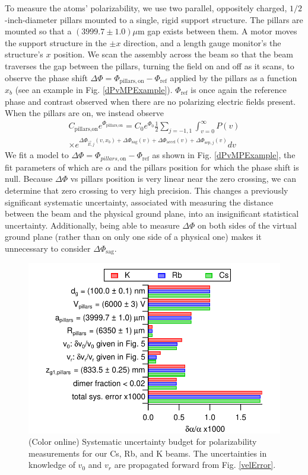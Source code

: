 \documentclass[twocolumn,prl,showpacs,superscriptaddress]{revtex4-1}   %
\newcommand{\figref}[1]{Fig. \ref{#1}}
\newcommand{\dphisepj}{\Delta\Phi_{\mathrm{sep},j}}
\newcommand{\dphisag}{\Delta\Phi_{\mathrm{sag}}}
\newcommand{\dphiaccel}{\Delta\Phi_{\mathrm{accel}}}
\begin{document}
To measure the atoms' polarizability, we use two parallel, oppositely charged, $1/2$-inch-diameter pillars mounted to a single, rigid support structure. The pillars are mounted so that a $(3999.7 \pm 1.0)\mu$m gap exists between them. A motor moves the support structure in the $\pm x$ direction, and a length gauge monitor's the structure's $x$ position. We scan the assembly across the beam so that the beam traverses the gap between the pillars, turning the field on and off as it scans, to observe the phase shift $\Delta\Phi = \Phi_{\mathrm{pillars,on}} - \Phi_{\mathrm{ref}}$ applied by the pillars as a function $x_b$ (see an example in \figref{dPvMPExample}). $\Phi_{\mathrm{ref}}$ is once again the reference phase and contrast observed when there are no polarizing electric fields present.
When the pillars are on, we instead observe
\begin{align}
	C_{\textrm{pillars,on}}e^{\Phi_{\textrm{pillars,on}}} = 
		C_0e^{\Phi_0}		
		\frac{1}{2} \sum_{j=-1,1}
		\int_{v=0}^{\infty} P(v) \nonumber \\ \times
		e^{
			\Delta\Phi_{\vec{E},j}(v,x_b) + 
			\dphisag(v) + \dphiaccel(v) + \dphisepj(v)
		} 
		dv
	\label{CPPolesEOn}
\end{align}
We fit a model to $\Delta\Phi = \Phi_{pillars,\mathrm{on}} - \Phi_{\mathrm{ref}}$ as shown in \figref{dPvMPExample}, the fit parameters of which are $\alpha$ and the pillars position for which the phase shift is null. Because $\Delta\Phi$ vs pillars position is very linear near the zero crossing, we can determine that zero crossing to very high precision. 
This changes a previously significant systematic uncertainty, associated with measuring the distance between the beam and the physical ground plane, into an insignificant statistical uncertainty.
Additionally, being able to measure $\Delta\Phi$ on both sides of the virtual ground plane (rather than on only one side of a physical one) makes it unnecessary to consider $\dphisag$. 

\begin{figure}
\includegraphics[width=\linewidth,keepaspectratio]{displayPolErrors.pdf}
\caption{\label{polError}(Color online) Systematic uncertainty budget for polarizability measurements for our Cs, Rb, and K beams.
The uncertainties in knowledge of $v_0$ and $v_r$ are propagated forward from \figref{velError}.}
\end{figure}
\end{document}
